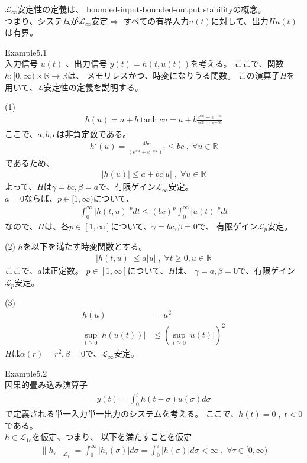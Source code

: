 \documentclass{jsarticle}
\begin{document}
$\mathcal L_\infty$安定性の定義は、
bounded-input-bounded-output stabilityの概念。\\
つまり、システムが$\mathcal L_\infty$安定$\Rightarrow$
すべての有界入力$u(t)$に対して、出力$Hu(t)$は有界。

{\color{gray}\hrulefill}
\newpage

Example5.1\\
入力信号 $u(t)$ 、出力信号 $y(t) = h(t, u(t))$を考える。
ここで、関数$h \colon [0,\infty) \times \mathbb R\rightarrow \mathbb R$は、
メモリレスかつ、時変になりうる関数。
この演算子$H$を用いて、$\mathcal L$安定性の定義を説明する。

(1)
\begin{align}
  h(u) = a+ b \tanh cu = a+ b \frac{e^{cu}-e^{-cu}}{e^{cu}+e^{-cu}}
\end{align}
ここで、$a,b,c$は非負定数である。
\begin{align}
  h'(u) = \frac{4bc}{(e^{cu}+e^{-cu})^2} \leq  bc\;,\;\forall u\in \mathbb R
\end{align}
であるため、
\begin{align}
  |h(u)| \leq a+bc|u| \;,\;\forall u\in \mathbb R
\end{align}
よって、$H$は$\gamma = bc,\beta = a$で、有限ゲイン$\mathcal L_\infty$安定。\\
$a=0$ならば、$p\in [1,\infty)$について、
\begin{align}
  \int^\infty_0 |h(t,u)|^p dt \leq (bc)^p\int^\infty_0 |u(t)|^p dt
\end{align}
なので、$H$は、各$p\in[1,\infty]$について、$\gamma = bc,\beta = 0$で、
有限ゲイン$\mathcal L_p$安定。

(2) $h$を以下を満たす時変関数とする。
\begin{align}
  |h(t,u)|\leq a|u|\;,\;\forall t \geq 0 , u\in \mathbb R
\end{align}
ここで、$a$は正定数。
$p\in [1,\infty]$について、$H$は、
$\gamma = a,\beta = 0$で、有限ゲイン$\mathcal L_p$安定。

(3)
\begin{align}
  h(u) &= u^2\\
  \sup_{t\geq 0} |h(u(t))| &\leq (\sup_{t\geq 0}|u(t)|)^2
\end{align}
$H$は$\alpha(r)= r^2,\beta = 0$で、$\mathcal L_\infty$安定。

{\color{gray}\hrulefill}

Example5.2\\
因果的畳み込み演算子
\begin{align}
  y(t) = \int^t_0 h(t-\sigma)u(\sigma)d\sigma
\end{align}
で定義される単一入力単一出力のシステムを考える。
ここで、$h(t)=0\;,\;t<0$である。\\
$h\in \mathcal L_{1e}$を仮定、つまり、
以下を満たすことを仮定
\begin{align}
  \|h_\tau\|_{\mathcal L_{1}} = 
  \int^\infty_0 |h_\tau(\sigma)|d\sigma = 
  \int^\tau_0 |h(\sigma)|d\sigma <\infty\;,\;\forall \tau\in [0,\infty)
\end{align}
\end{document}
